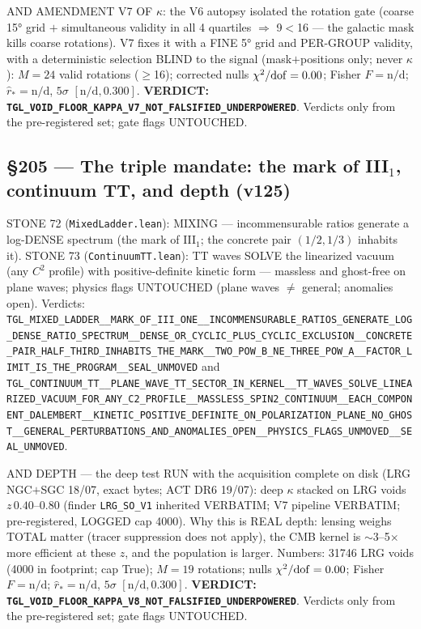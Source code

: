 \documentclass[11pt]{article}
\theoremstyle{definition}\newtheorem{deriv}{Derivation}
\begin{document}
AND AMENDMENT V7 OF $\kappa$: the V6 autopsy isolated the rotation gate (coarse 15° grid $+$ simultaneous validity in all 4 quartiles $\Rightarrow$ 9$<$16 --- the galactic mask kills coarse rotations). V7 fixes it with a FINE 5° grid and PER-GROUP validity, with a deterministic selection BLIND to the signal (mask$+$positions only; never $\kappa$): $M=24$ valid rotations ($\geq$16); corrected nulls $\chi^2/{\rm dof}=0.00$; Fisher $F=\text{n/d}$; $\hat r_*=\text{n/d}$, $5\sigma$ $[\text{n/d},0.300]$. \textbf{VERDICT: \texttt{TGL\_VOID\_FLOOR\_KAPPA\_V7\_NOT\_FALSIFIED\_UNDERPOWERED}}. Verdicts only from the pre-registered set; gate flags UNTOUCHED.

\subsection*{\S205 --- The triple mandate: the mark of III$_1$, continuum TT, and depth (v125)}STONE 72 (\texttt{MixedLadder.lean}): MIXING — incommensurable ratios generate a log-DENSE spectrum (the mark of III$_1$; the concrete pair $(1/2,1/3)$ inhabits it). STONE 73 (\texttt{ContinuumTT.lean}): TT waves SOLVE the linearized vacuum (any $C^2$ profile) with positive-definite kinetic form — massless and ghost-free on plane waves; physics flags UNTOUCHED (plane waves $\neq$ general; anomalies open). Verdicts: \texttt{TGL\_MIXED\_LADDER\_\_MARK\_OF\_III\_ONE\_\_INCOMMENSURABLE\_RATIOS\_GENERATE\_LOG\_DENSE\_RATIO\_SPECTRUM\_\_DENSE\_OR\_CYCLIC\_PLUS\_CYCLIC\_EXCLUSION\_\_CONCRETE\_PAIR\_HALF\_THIRD\_INHABITS\_THE\_MARK\_\_TWO\_POW\_B\_NE\_THREE\_POW\_A\_\_FACTOR\_LIMIT\_IS\_THE\_PROGRAM\_\_SEAL\_UNMOVED} and \texttt{TGL\_CONTINUUM\_TT\_\_PLANE\_WAVE\_TT\_SECTOR\_IN\_KERNEL\_\_TT\_WAVES\_SOLVE\_LINEARIZED\_VACUUM\_FOR\_ANY\_C2\_PROFILE\_\_MASSLESS\_SPIN2\_CONTINUUM\_\_EACH\_COMPONENT\_DALEMBERT\_\_KINETIC\_POSITIVE\_DEFINITE\_ON\_POLARIZATION\_PLANE\_NO\_GHOST\_\_GENERAL\_PERTURBATIONS\_AND\_ANOMALIES\_OPEN\_\_PHYSICS\_FLAGS\_UNMOVED\_\_SEAL\_UNMOVED}.

AND DEPTH — the deep test RUN with the acquisition complete on disk (LRG NGC$+$SGC 18/07, exact bytes; ACT DR6 19/07): deep $\kappa$ stacked on LRG voids $z\,0.40$--$0.80$ (finder \texttt{LRG\_SO\_V1} inherited VERBATIM; V7 pipeline VERBATIM; pre-registered, LOGGED cap 4000). Why this is REAL depth: lensing weighs TOTAL matter (tracer suppression does not apply), the CMB kernel is $\sim$3--5$\times$ more efficient at these $z$, and the population is larger. Numbers: 31746 LRG voids (4000 in footprint; cap True); $M=19$ rotations; nulls $\chi^2/{\rm dof}=0.00$; Fisher $F=\text{n/d}$; $\hat r_*=\text{n/d}$, $5\sigma$ $[\text{n/d},0.300]$. \textbf{VERDICT: \texttt{TGL\_VOID\_FLOOR\_KAPPA\_V8\_NOT\_FALSIFIED\_UNDERPOWERED}}. Verdicts only from the pre-registered set; gate flags UNTOUCHED.
\end{document}

